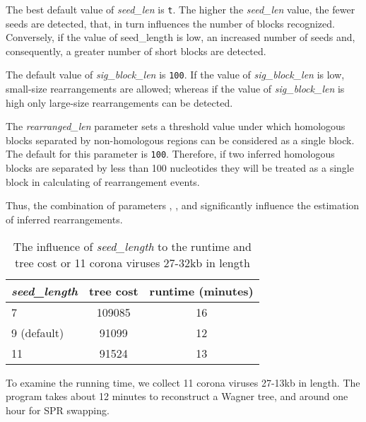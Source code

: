 The best default value of \emph{seed\_len} is \texttt{t}.
The higher the \emph{seed\_len} value, the fewer seeds are detected,
that, in turn influences the number of blocks recognized. Conversely, if the
value of seed\_length is low, an increased number of seeds and, consequently, a
greater number of short blocks are detected.

The default value of \emph{sig\_block\_len} is \texttt{100}. 
If the value of \emph{sig\_block\_len} is low, small-size rearrangements are allowed;
whereas if the value of \emph{sig\_block\_len} is high only large-size
rearrangements can be detected.

The \emph{rearranged\_len} parameter sets a threshold
value under which homologous blocks separated by non-homologous regions can be
considered as a single block. 
The default for this parameter is \texttt{100}.  Therefore, if two inferred
homologous blocks are separated by less than 100 nucleotides they will be
treated as a single block in calculating of rearrangement events.

Thus, the combination of parameters , 
, 
and significantly influence the estimation of inferred rearrangements.


\begin{table}[t]
\caption{The influence of \emph{seed\_length} to the runtime and tree cost
or 11 corona viruses 27-32kb in length}
\label{seedLength} 
\begin{center}
\begin{tabular}{l c c}
\hline
	\emph{seed\_length} & tree cost & runtime (minutes) \\
\hline
         7             & 109085   & 16\\
         9 (default)   & 91099   & 12\\
         11            & 91524   & 13\\
\hline
\end{tabular}
\end{center}
\end{table}

To examine the running time, we collect 11 corona viruses 
27-13kb in length. The program takes about 12 minutes
to reconstruct a Wagner tree, and around one hour 
for SPR swapping.



